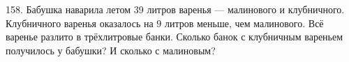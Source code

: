 158. Бабушка наварила летом 39 литров варенья --- малинового и клубничного. Клубничного варенья оказалось на 9 литров меньше, чем малинового. Всё варенье разлито в трёхлитровые банки. Сколько банок с клубничным вареньем получилось у бабушки? И сколько с малиновым?\\

